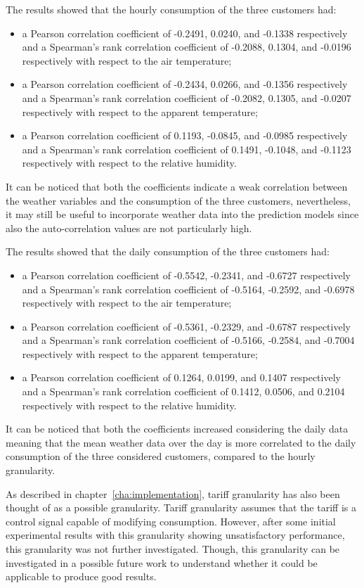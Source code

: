 The results showed that the hourly consumption of the three customers had:
\begin{itemize}
  \item a Pearson correlation coefficient of -0.2491, 0.0240, and -0.1338 respectively and a Spearman's rank correlation coefficient of -0.2088, 0.1304, and -0.0196 respectively with respect to the air temperature;
  \item a Pearson correlation coefficient of -0.2434, 0.0266, and -0.1356 respectively and a Spearman's rank correlation coefficient of -0.2082, 0.1305, and -0.0207 respectively with respect to the apparent temperature;
  \item a Pearson correlation coefficient of 0.1193, -0.0845, and -0.0985 respectively and a Spearman's rank correlation coefficient of 0.1491, -0.1048, and -0.1123 respectively with respect to the relative humidity.
\end{itemize}
It can be noticed that both the coefficients indicate a weak correlation between the weather variables and the consumption of the three customers, nevertheless, it may still be useful to incorporate weather data into the prediction models since also the auto-correlation values are not particularly high.

The results showed that the daily consumption of the three customers had:
\begin{itemize}
  \item a Pearson correlation coefficient of -0.5542, -0.2341, and -0.6727 respectively and a Spearman's rank correlation coefficient of -0.5164, -0.2592, and -0.6978 respectively with respect to the air temperature;
  \item a Pearson correlation coefficient of -0.5361, -0.2329, and -0.6787 respectively and a Spearman's rank correlation coefficient of -0.5166, -0.2584, and -0.7004 respectively with respect to the apparent temperature;
  \item a Pearson correlation coefficient of 0.1264, 0.0199, and 0.1407 respectively and a Spearman's rank correlation coefficient of 0.1412, 0.0506, and 0.2104 respectively with respect to the relative humidity.
\end{itemize}
It can be noticed that both the coefficients increased considering the daily data meaning that the mean weather data over the day is more correlated to the daily consumption of the three considered customers, compared to the hourly granularity.

As described in chapter~\ref{cha:implementation}, tariff granularity has also been thought of as a possible granularity.
Tariff granularity assumes that the tariff is a control signal capable of modifying consumption.
However, after some initial experimental results with this granularity showing unsatisfactory performance, this granularity was not further investigated.
Though, this granularity can be investigated in a possible future work to understand whether it could be applicable to produce good results.

